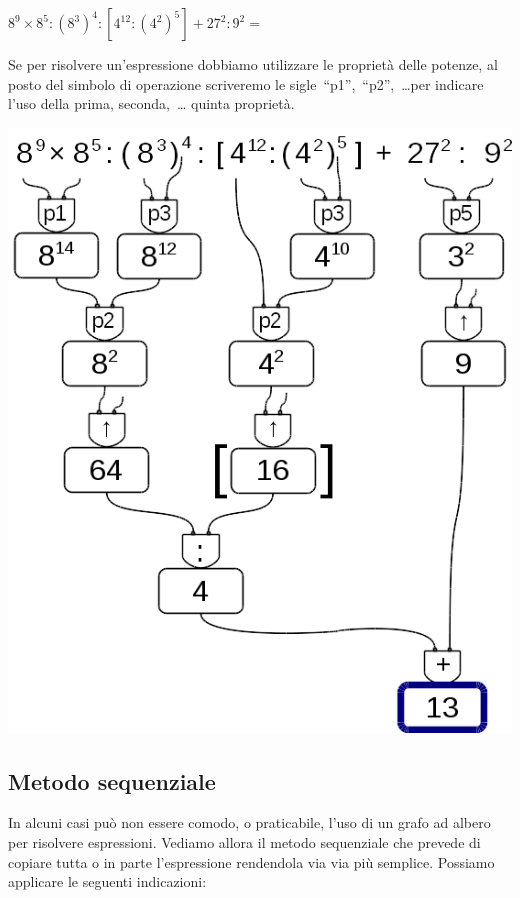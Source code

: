  \begin{esempio}
  \(8^9 \times 8^5 : (8^3)^4 : [4^{12} : (4^2)^5] + 27^2 : 9^2 =\)
  
  Se per risolvere un'espressione dobbiamo utilizzare le proprietà delle 
  potenze, al posto del simbolo di operazione scriveremo le 
  sigle~``p1'',~``p2'',~\dots per indicare l'uso della prima, seconda,~\dots
  quinta proprietà.
  
\begin{inaccessibleblock}[]
 \begin{center}
  \includegraphics[scale=0.35]{img/op_espr_pot.png}
 \end{center}
\end{inaccessibleblock}
 \end{esempio}

\subsection{Metodo sequenziale}

In alcuni casi può non essere comodo, o praticabile, l'uso di un grafo ad 
albero per risolvere espressioni. 
Vediamo allora il metodo sequenziale che prevede di copiare tutta o in 
parte l'espressione rendendola via via più semplice. 
Possiamo applicare le seguenti indicazioni:

